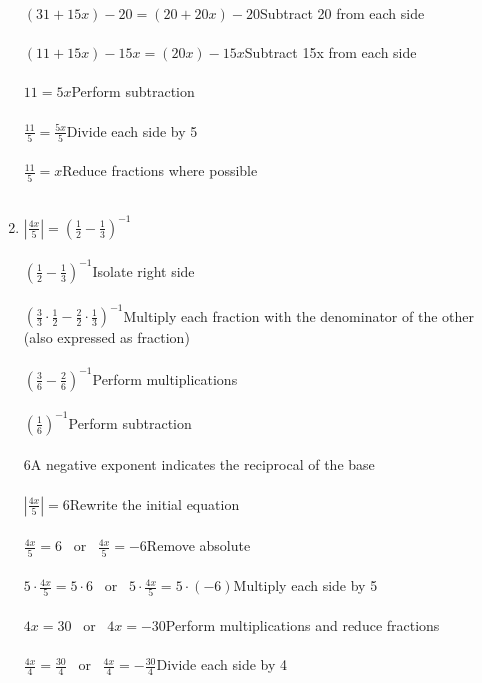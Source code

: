 \documentclass[a4paper,11pt]{article}
\begin{document}
\begin{enumerate}
         $(31 + 15x) - 20 = (20 + 20x) - 20$\hfill Subtract 20 from each side\\\\
         $(11 + 15x) - 15x = (20x) - 15x$\hfill Subtract 15x from each side\\\\
         $11 = 5x$\hfill Perform subtraction\\\\
         $\frac{11}{5} = \frac{5x}{5}$\hfill Divide each side by 5\\\\
         $\frac{11}{5} = x$\hfill Reduce fractions where possible\\\\
    \item 
         $|\frac{4x}{5}| = (\frac{1}{2} - \frac{1}{3}) ^{-1}$ \\\\
         $(\frac{1}{2} - \frac{1}{3}) ^{-1}$\hfill Isolate right side\\\\
         $(\frac{3}{3} \cdot \frac{1}{2} - \frac{2}{2} \cdot \frac{1}{3}) ^{-1}$\hfill Multiply each fraction with the denominator of the other (also expressed as fraction)\\\\
         $(\frac{3}{6} - \frac{2}{6}) ^{-1}$\hfill Perform multiplications\\\\
         $(\frac{1}{6}) ^{-1}$\hfill Perform subtraction\\\\
         $6$\hfill A negative exponent indicates the reciprocal of the base\\\\
         $|\frac{4x}{5}| = 6$\hfill Rewrite the initial equation\\\\
         $\frac{4x}{5} = 6$ ~or~ $\frac{4x}{5} = -6$\hfill Remove absolute\\\\
         $5 \cdot \frac{4x}{5} = 5 \cdot 6$ ~or~ $5 \cdot \frac{4x}{5} = 5 \cdot (-6)$\hfill Multiply each side by 5\\\\
         $4x = 30$ ~or~ $4x = -30$\hfill Perform multiplications and reduce fractions\\\\
         $\frac{4x}{4} = \frac{30}{4}$ ~or~ $\frac{4x}{4} = -\frac{30}{4}$\hfill Divide each side by 4\\\\

\end{enumerate}
\end{document}
